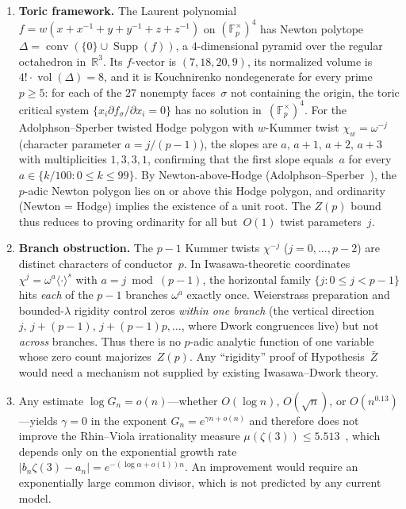 \documentclass[11pt]{article}
\theoremstyle{definition}
\theoremstyle{remark}
\begin{document}
\begin{enumerate}
\item \textbf{Toric framework.}
The Laurent polynomial
$f = w(x + x^{-1} + y + y^{-1} + z + z^{-1})$
on $(\mathbb{F}_p^{\times})^4$ has
Newton polytope
$\Delta = \operatorname{conv}(\{0\} \cup \operatorname{Supp}(f))$,
a $4$-dimensional pyramid over the regular
octahedron in~$\mathbb{R}^3$.
Its $f$-vector is $(7, 18, 20, 9)$,
its normalized volume is
$4!\cdot\operatorname{vol}(\Delta) = 8$,
and it is Kouchnirenko nondegenerate for
every prime $p \ge 5$: for each of the
$27$ nonempty faces~$\sigma$ not
containing the origin,
the toric critical system
$\{x_i \partial f_\sigma / \partial x_i = 0\}$
has no solution in~$(\mathbb{F}_p^\times)^4$.
For the Adolphson--Sperber twisted
Hodge polygon with $w$-Kummer twist
$\chi_w = \omega^{-j}$
(character parameter $a = j/(p{-}1)$),
the slopes are
$a,\, a{+}1,\, a{+}2,\, a{+}3$
with multiplicities $1,3,3,1$,
confirming that the first slope
equals~$a$ for every
$a \in \{k/100 : 0 \le k \le 99\}$.
By Newton-above-Hodge
(Adolphson--Sperber~\cite{AS1993}),
the $p$-adic Newton polygon lies on
or above this Hodge polygon,
and ordinarity (Newton = Hodge) implies
the existence of a unit root.
The $Z(p)$ bound thus reduces to
proving ordinarity for all but~$O(1)$
twist parameters~$j$.

\item \textbf{Branch obstruction.}
The $p-1$ Kummer twists
$\chi^{-j}$ ($j = 0, \ldots, p-2$)
are distinct characters of conductor~$p$.
In Iwasawa-theoretic coordinates
$\chi^j = \omega^a \langle \cdot \rangle^s$
with $a = j \bmod{(p{-}1)}$,
the horizontal family
$\{j : 0 \le j < p{-}1\}$
hits \emph{each} of the $p{-}1$ branches
$\omega^a$ exactly once.
Weierstrass preparation and
bounded-$\lambda$ rigidity control
zeros \emph{within one branch}
(the vertical direction
$j,\, j + (p{-}1),\, j + (p{-}1)p, \ldots$,
where Dwork congruences live)
but not \emph{across} branches.
Thus there is no $p$-adic analytic
function of one variable whose
zero count majorizes~$Z(p)$.
Any ``rigidity'' proof of
Hypothesis~$\bar{Z}$ would need a
mechanism not supplied by
existing Iwasawa--Dwork theory.

\item Any estimate $\log G_n = o(n)$---whether
      $O(\log n)$, $O(\sqrt{n})$, or $O(n^{0.13})$---yields
      $\gamma = 0$ in the exponent $G_n = e^{\gamma n + o(n)}$
      and therefore does not improve the Rhin--Viola
      irrationality measure
      $\mu(\zeta(3)) \le 5.513$~\cite{RhinViola2001},
      which depends only on the exponential growth rate
      $|b_n \zeta(3) - a_n| = e^{-(\log\alpha + o(1))n}$.
      An improvement would require an exponentially large
      common divisor, which is not predicted by any current
      model.


\end{enumerate}
\end{document}
